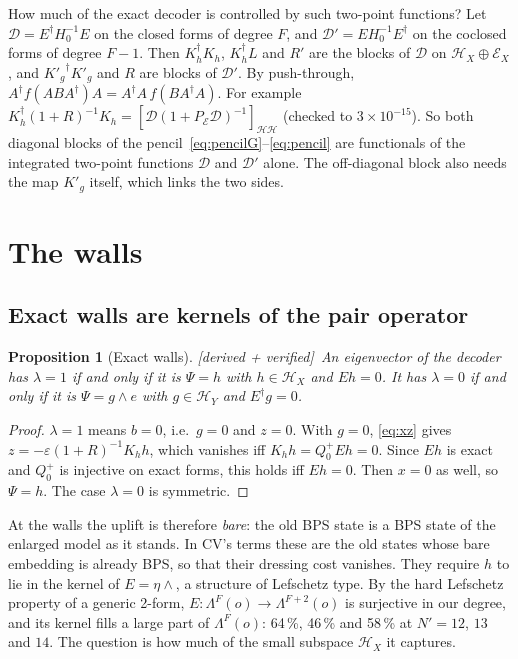 \documentclass[11pt]{article}
\newcommand{\Np}{N'}
\newcommand{\eps}{\varepsilon}
\newcommand{\Hc}{\mathcal H}
\newcommand{\Ec}{\mathcal E}
\newcommand{\Kh}{K_h}
\newcommand{\Kg}{{K'_g}}
\newcommand{\tagbox}[2]{\textsf{\small\color{#1}[#2]}}
\newcommand{\VER}{\tagbox{cder}{derived + verified}}
\theoremstyle{plain}
\newtheorem{proposition}{Proposition}
\theoremstyle{remark}
\numberwithin{equation}{section}
\begin{document}
How much of the exact decoder is controlled by such two-point functions? Let
$\mathcal D=E^\dagger H_0^{-1}E$ on the closed forms of degree $F$, and $\mathcal D'=EH_0^{-1}E^\dagger$ on the coclosed
forms of degree $F-1$. Then $\Kh^\dagger\Kh$, $\Kh^\dagger L$ and $R'$ are the blocks of $\mathcal D$ on
$\Hc_X\oplus\Ec_X$, and $\Kg^\dagger\Kg$ and $R$ are blocks of $\mathcal D'$. By push-through,
$A^\dagger f(ABA^\dagger)A=A^\dagger A\,f(BA^\dagger A)$. For example $\Kh^\dagger(1+R)^{-1}\Kh=[\mathcal D(1+P_{\Ec}\mathcal D)^{-1}]_{\Hc\Hc}$
(checked to $3\times10^{-15}$). So both diagonal blocks of the pencil~\eqref{eq:pencilG}--\eqref{eq:pencil} are functionals of the integrated
two-point functions $\mathcal D$ and $\mathcal D'$ alone. The off-diagonal block also needs the map $\Kg$ itself, which
links the two sides.

\section{The walls}\label{sec:walls}

\subsection{Exact walls are kernels of the pair operator}

\begin{proposition}[Exact walls]\label{prop:walls}\VER\
An eigenvector of the decoder has $\lambda=1$ if and only if it is $\Psi=h$ with $h\in\Hc_X$ and $Eh=0$. It has $\lambda=0$
if and only if it is $\Psi=g\wedge e$ with $g\in\Hc_Y$ and $E^\dagger g=0$.
\end{proposition}

\begin{proof}
$\lambda=1$ means $b=0$, i.e.\ $g=0$ and $z=0$. With $g=0$, \eqref{eq:xz} gives $z=-\eps(1+R)^{-1}\Kh h$, which vanishes
iff $\Kh h=Q_0^+Eh=0$. Since $Eh$ is exact and $Q_0^+$ is injective on exact forms, this holds iff $Eh=0$. Then $x=0$ as
well, so $\Psi=h$. The case $\lambda=0$ is symmetric.
\end{proof}

At the walls the uplift is therefore \emph{bare}: the old BPS state is a BPS state of the enlarged model as it stands.
In CV's terms these are the old states whose bare embedding is already BPS, so that their dressing cost vanishes. They
require $h$ to lie in the kernel of $E=\eta\wedge$, a structure of Lefschetz type. By the hard Lefschetz property of a
generic 2-form, $E:\Lambda^F(o)\to\Lambda^{F+2}(o)$ is surjective in our degree, and its kernel fills a large part of
$\Lambda^F(o)$: 64\,\%, 46\,\% and 58\,\% at $\Np=12$, $13$ and $14$. The question is how much of the small subspace $\Hc_X$ it
captures.
\end{document}
